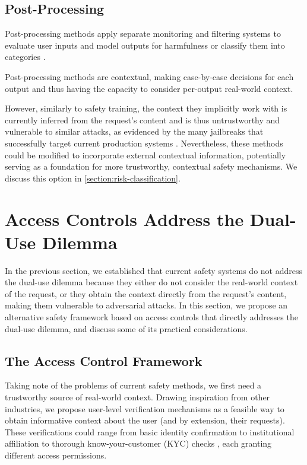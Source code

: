 \documentclass{article}
\theoremstyle{plain}
\theoremstyle{definition}
\theoremstyle{remark}
\begin{document}
\subsection{Post-Processing}

Post-processing methods apply separate monitoring and filtering systems to evaluate user inputs and model outputs for harmfulness \cite{inan2023llamaguardllmbasedinputoutput, sharma2025constitutionalclassifiersdefendinguniversal} or classify them into categories \cite{handa2025economictasksperformedai}.

Post-processing methods are contextual, making case-by-case decisions for each output and thus having the capacity to consider per-output real-world context.

However, similarly to safety training, the context they implicitly work with is currently inferred from the request's content and is thus untrustworthy and vulnerable to similar attacks, as evidenced by the many jailbreaks that successfully target current production systems \cite{zhang2025outputconstraintsattacksurface}. Nevertheless, these methods could be modified to incorporate external contextual information, potentially serving as a foundation for more trustworthy, contextual safety mechanisms. We discuss this option in \cref{section:risk-classification}.

\section{Access Controls Address the Dual-Use Dilemma} \label{section:access-controls}

In the previous section, we established that current safety systems do not address the dual-use dilemma because they either do not consider the real-world context of the request, or they obtain the context directly from the request's content, making them vulnerable to adversarial attacks. In this section, we propose an alternative safety framework based on access controls that directly addresses the dual-use dilemma, and discuss some of its practical considerations.

\subsection{The Access Control Framework}

Taking note of the problems of current safety methods, we first need a trustworthy source of real-world context. Drawing inspiration from other industries, we propose user-level verification mechanisms as a feasible way to obtain informative context about the user (and by extension, their requests). These verifications could range from basic identity confirmation to institutional affiliation to thorough know-your-customer (KYC) checks \cite{FATF2025}, each granting different access permissions.
\end{document}
